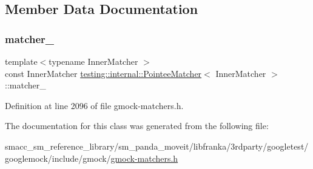 \subsection{Member Data Documentation}
\mbox{\label{classtesting_1_1internal_1_1PointeeMatcher_aa429edbc73c0350807d9b0ffcc6ab922}} 
\subsubsection{\texorpdfstring{matcher\+\_\+}{matcher\_}}
{\footnotesize\ttfamily template$<$typename Inner\+Matcher $>$ \\
const Inner\+Matcher \hyperlink{classtesting_1_1internal_1_1PointeeMatcher}{testing\+::internal\+::\+Pointee\+Matcher}$<$ Inner\+Matcher $>$\+::matcher\+\_\+\hspace{0.3cm}{\ttfamily [private]}}



Definition at line 2096 of file gmock-\/matchers.\+h.



The documentation for this class was generated from the following file\+:\begin{DoxyCompactItemize}
\item 
smacc\+\_\+sm\+\_\+reference\+\_\+library/sm\+\_\+panda\+\_\+moveit/libfranka/3rdparty/googletest/googlemock/include/gmock/\hyperlink{gmock-matchers_8h}{gmock-\/matchers.\+h}\end{DoxyCompactItemize}
